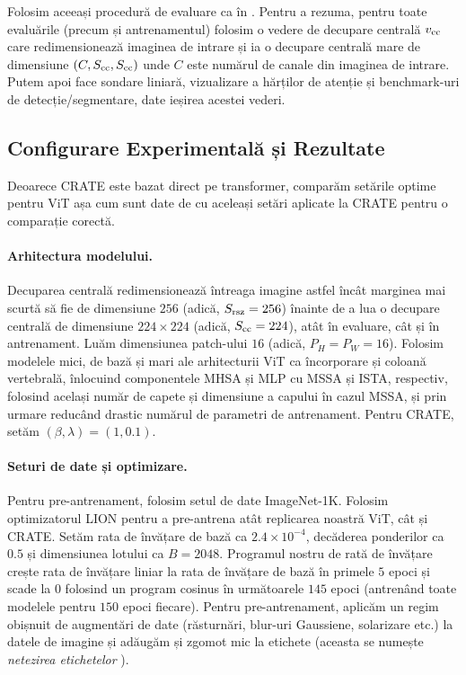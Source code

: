 \documentclass[../../book-main_ro.tex]{subfiles}
\begin{document}
Folosim aceeași procedură de evaluare ca în . Pentru a rezuma, pentru toate evaluările (precum și antrenamentul) folosim o vedere de decupare centrală \(v_{\mathrm{cc}}\) care redimensionează imaginea de intrare și ia o decupare centrală mare de dimensiune \((C, S_{\mathrm{cc}}, S_{\mathrm{cc}})\) unde \(C\) este numărul de canale din imaginea de intrare. Putem apoi face sondare liniară, vizualizare a hărților de atenție și benchmark-uri de detecție/segmentare, date ieșirea acestei vederi.

\subsection{Configurare Experimentală și Rezultate}\label{sub:image_classification_experiments}

Deoarece CRATE este bazat direct pe transformer, comparăm setările optime pentru ViT așa cum sunt date de \cite{dosovitskiy2020image,touvron2020training} cu aceleași setări aplicate la CRATE pentru o comparație corectă.

\paragraph{Arhitectura modelului.} Decuparea centrală redimensionează întreaga imagine astfel încât marginea mai scurtă să fie de dimensiune \(256\) (adică, \(S_{\mathrm{rsz}} = 256\)) înainte de a lua o decupare centrală de dimensiune \(224 \times 224\) (adică, \(S_{\mathrm{cc}} = 224\)), atât în evaluare, cât și în antrenament. Luăm dimensiunea patch-ului \(16\) (adică, \(P_{H} = P_{W} = 16\)). Folosim modelele mici, de bază și mari ale arhitecturii ViT \cite{dosovitskiy2020image} ca încorporare și coloană vertebrală, înlocuind componentele MHSA și MLP cu MSSA și ISTA, respectiv, folosind același număr de capete și dimensiune a capului în cazul MSSA, și prin urmare reducând drastic numărul de parametri de antrenament. Pentru CRATE, setăm \((\beta, \lambda) = (1, 0.1)\).

\paragraph{Seturi de date și optimizare.} Pentru pre-antrenament, folosim setul de date ImageNet-1K. Folosim optimizatorul LION \citep{chen2024symbolic} pentru a pre-antrena atât replicarea noastră ViT, cât și CRATE. Setăm rata de învățare de bază ca \(2.4 \times 10^{-4}\), decăderea ponderilor ca \(0.5\) și dimensiunea lotului ca \(B = 2048\). Programul nostru de rată de învățare crește rata de învățare liniar la rata de învățare de bază în primele \(5\) epoci și scade la \(0\) folosind un program cosinus în următoarele \(145\) epoci (antrenând toate modelele pentru \(150\) epoci fiecare). Pentru pre-antrenament, aplicăm un regim obișnuit de augmentări de date (răsturnări, blur-uri Gaussiene, solarizare etc.) la datele de imagine și adăugăm și zgomot mic la etichete (aceasta se numește \textit{netezirea etichetelor} \citep{muller2019does}).
\end{document}
